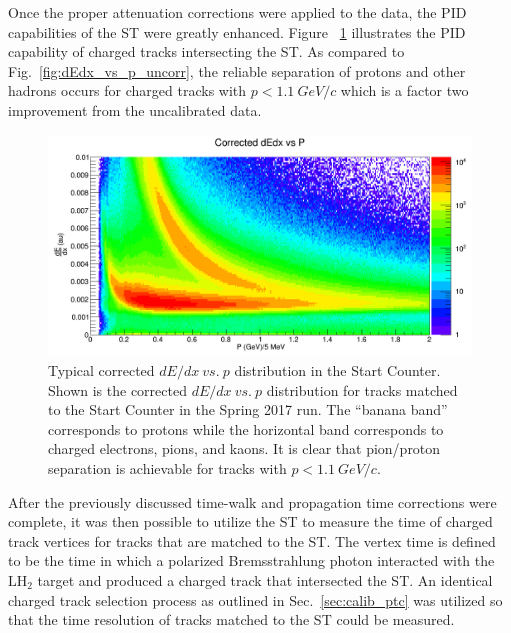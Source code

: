 Once the proper attenuation corrections were applied to the data, the PID capabilities of the ST were greatly enhanced.  Figure ~\ref{fig:dEdx_vs_p_corr} illustrates the PID capability of charged tracks intersecting the ST.  As compared to Fig.~\ref{fig:dEdx_vs_p_uncorr}, the reliable separation of protons and other hadrons occurs for charged tracks with $p < 1.1\ GeV/c$ which is a factor two improvement from the uncalibrated data.
	\begin{figure}[!htb]
		\centering
		\includegraphics[width=1.0\columnwidth]{performance/figs/dEdx_vs_p_corr}
		\caption{Typical corrected $dE/dx\ vs.\ p$ distribution in the Start Counter.  Shown is the corrected $dE/dx\ vs.\ p$ distribution for tracks matched to the Start Counter in the Spring 2017 run. The ``banana band'' corresponds to protons while the horizontal band corresponds to charged electrons, pions, and kaons.  It is clear that pion/proton separation is achievable for tracks with $p < 1.1\ GeV/c$.}
		\label{fig:dEdx_vs_p_corr}
	\end{figure}  

After the previously discussed time-walk and propagation time corrections were complete, it was then possible to utilize the ST to measure the time of charged track vertices for tracks that are matched to the ST.  The vertex time is defined to be the time in which a polarized Bremsstrahlung photon interacted with the $\mathrm{LH_{2}}$ target and produced a charged track that intersected the ST.  An identical charged track selection process as outlined in Sec.~\ref{sec:calib_ptc} was utilized so that the time resolution of tracks matched to the ST could be measured.

